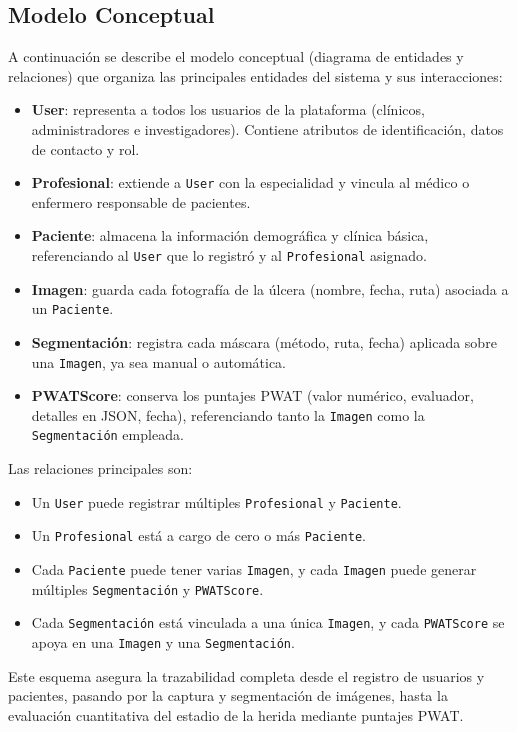 \subsection{Modelo Conceptual}
\label{ssc:MC}

A continuación se describe el modelo conceptual (diagrama de entidades y relaciones) que organiza las principales entidades del sistema y sus interacciones:

\begin{itemize}
  \item \textbf{User}: representa a todos los usuarios de la plataforma (clínicos, administradores e investigadores). Contiene atributos de identificación, datos de contacto y rol.
  \item \textbf{Profesional}: extiende a \texttt{User} con la especialidad y vincula al médico o enfermero responsable de pacientes.
  \item \textbf{Paciente}: almacena la información demográfica y clínica básica, referenciando al \texttt{User} que lo registró y al \texttt{Profesional} asignado.
  \item \textbf{Imagen}: guarda cada fotografía de la úlcera (nombre, fecha, ruta) asociada a un \texttt{Paciente}.
  \item \textbf{Segmentación}: registra cada máscara (método, ruta, fecha) aplicada sobre una \texttt{Imagen}, ya sea manual o automática.
  \item \textbf{PWATScore}: conserva los puntajes PWAT (valor numérico, evaluador, detalles en JSON, fecha), referenciando tanto la \texttt{Imagen} como la \texttt{Segmentación} empleada.
\end{itemize}

Las relaciones principales son:
\begin{itemize}
  \item Un \texttt{User} puede registrar múltiples \texttt{Profesional} y \texttt{Paciente}.
  \item Un \texttt{Profesional} está a cargo de cero o más \texttt{Paciente}.
  \item Cada \texttt{Paciente} puede tener varias \texttt{Imagen}, y cada \texttt{Imagen} puede generar múltiples \texttt{Segmentación} y \texttt{PWATScore}.
  \item Cada \texttt{Segmentación} está vinculada a una única \texttt{Imagen}, y cada \texttt{PWATScore} se apoya en una \texttt{Imagen} y una \texttt{Segmentación}.
\end{itemize}

Este esquema asegura la trazabilidad completa desde el registro de usuarios y pacientes, pasando por la captura y segmentación de imágenes, hasta la evaluación cuantitativa del estadio de la herida mediante puntajes PWAT.

